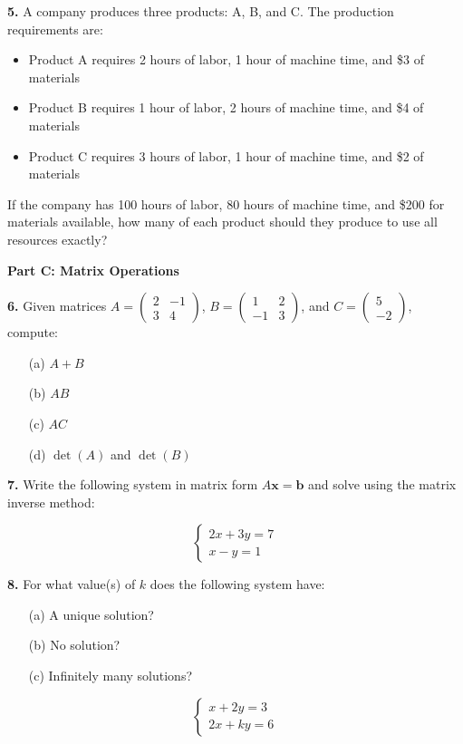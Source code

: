 \documentclass[12pt]{article}
\begin{document}
\textbf{5.} A company produces three products: A, B, and C. The production requirements are:
\begin{itemize}
\item Product A requires 2 hours of labor, 1 hour of machine time, and \$3 of materials
\item Product B requires 1 hour of labor, 2 hours of machine time, and \$4 of materials  
\item Product C requires 3 hours of labor, 1 hour of machine time, and \$2 of materials
\end{itemize}

If the company has 100 hours of labor, 80 hours of machine time, and \$200 for materials available, how many of each product should they produce to use all resources exactly?
\vspace{6cm}

\newpage

\textbf{Part C: Matrix Operations}

\textbf{6.} Given matrices $A = \begin{pmatrix} 2 & -1 \\ 3 & 4 \end{pmatrix}$, $B = \begin{pmatrix} 1 & 2 \\ -1 & 3 \end{pmatrix}$, and $C = \begin{pmatrix} 5 \\ -2 \end{pmatrix}$, compute:

\begin{enumerate}
\item[(a)] $A + B$
\vspace{2cm}

\item[(b)] $AB$
\vspace{3cm}

\item[(c)] $AC$
\vspace{3cm}

\item[(d)] $\det(A)$ and $\det(B)$
\vspace{2cm}
\end{enumerate}

\textbf{7.} Write the following system in matrix form $A\mathbf{x} = \mathbf{b}$ and solve using the matrix inverse method:

$$\begin{cases}
2x + 3y = 7 \\
x - y = 1
\end{cases}$$
\vspace{4cm}

\textbf{8.} For what value(s) of $k$ does the following system have:
\begin{enumerate}
\item[(a)] A unique solution?
\item[(b)] No solution?
\item[(c)] Infinitely many solutions?
\end{enumerate}

$$\begin{cases}
x + 2y = 3 \\
2x + ky = 6
\end{cases}$$
\vspace{4cm}
\end{document}
